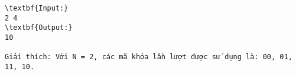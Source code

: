 \begin{verbatim}
\textbf{Input:}
2 4 
\textbf{Output:}
10

Giải thích: Với N = 2, các mã khóa lần lượt được sử dụng là: 00, 01, 11, 10. \end{verbatim}